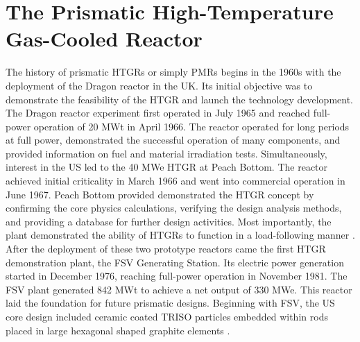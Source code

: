 \section{The Prismatic High-Temperature Gas-Cooled Reactor}

The history of prismatic \glspl{HTGR} or simply \glspl{PMR} begins in the 1960s with the deployment of the Dragon reactor in the \gls{UK}.
Its initial objective was to demonstrate the feasibility of the \gls{HTGR} and launch the technology development.
The Dragon reactor experiment first operated in July 1965 and reached full-power operation of 20 MWt in April 1966.
The reactor operated for long periods at full power, demonstrated the successful operation of many components, and provided information on fuel and material irradiation tests.
Simultaneously, interest in the \gls{US} led to the 40 MWe \gls{HTGR} at Peach Bottom.
The reactor achieved initial criticality in March 1966 and went into commercial operation in June 1967.
Peach Bottom provided demonstrated the \gls{HTGR} concept by confirming the core physics calculations, verifying the design analysis methods, and providing a database for further design activities.
Most importantly, the plant demonstrated the ability of \glspl{HTGR} to function in a load-following manner \cite{brey_development_2001}.
After the deployment of these two prototype reactors came the first \gls{HTGR} demonstration plant, the \gls{FSV} Generating Station.
Its electric power generation started in December 1976, reaching full-power operation in November 1981.
The \gls{FSV} plant generated 842 MWt to achieve a net output of 330 MWe.
This reactor laid the foundation for future prismatic designs.
Beginning with \gls{FSV}, the \gls{US} core design included ceramic coated \gls{TRISO} particles embedded within rods placed in large hexagonal shaped graphite elements \cite{brey_development_2001}.

